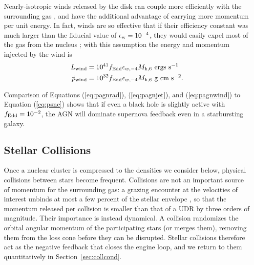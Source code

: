 \documentclass[preprint2]{aastex}
\newcommand{\mhsix}{M_{\rm h,6}\xspace}
\begin{document}
Nearly-isotropic winds released by the disk can couple more efficiently with the surrounding gas \citep{King:2015a}, and have the additional advantage of carrying more momentum per unit energy. In fact, winds are so effective that if their efficiency constant was much larger than the fiducial value of $\epsilon_{\rm w} = 10^{-4}$, they would easily expel most of the gas from the nucleus \citep{Ostriker:2010a}; with this assumption the energy and momentum injected by the wind is
\begin{align}
L_{\rm wind} &= 10^{41} f_{\rm Edd} \epsilon_{w,-4} \mhsix~{\rm ergs~s}^{-1}\\
\dot{p}_{\rm wind} &= 10^{32} f_{\rm Edd} \epsilon_{w,-4} \mhsix~{\rm g~cm~s}^{-2}\label{eq:pagnwind}.
\end{align}

Comparison of Equations (\ref{eq:pagnrad}), (\ref{eq:pagnjet}), and (\ref{eq:pagnwind}) to Equation (\ref{eq:psne}) shows that if even a black hole is slightly active with $f_{\rm Edd} = 10^{-2}$, the AGN will dominate supernova feedback even in a starbursting galaxy.

\subsection{Stellar Collisions}\label{subsec:coll}

Once a nuclear cluster is compressed to the densities we consider below, physical collisions between stars become frequent. Collisions are not an important source of momentum for the surrounding gas: a grazing encounter at the velocities of interest unbinds at most a few percent of the stellar envelope \citep{Lai:1993a,Freitag:2005a}, so that the momentum released per collision is smaller than that of a UDR by three orders of magnitude. Their importance is instead dynamical. A collision randomizes the orbital angular momentum of the participating stars (or merges them), removing them from the loss cone before they can be disrupted. Stellar collisions therefore act as the negative feedback that closes the engine loop, and we return to them quantitatively in Section~\ref{sec:collcond}.
\end{document}
